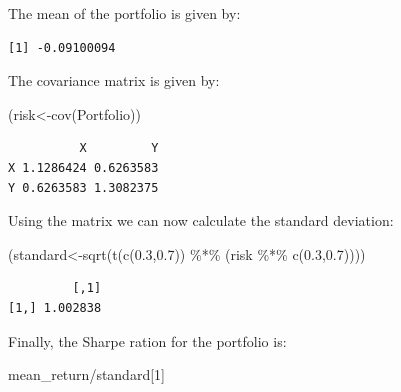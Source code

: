 \documentclass[
  letterpaper,
  DIV=11,
  numbers=noendperiod]{scrreprt}
\newenvironment{Shaded}{\begin{snugshade}}{\end{snugshade}}
\newcommand{\AttributeTok}[1]{\textcolor[rgb]{0.40,0.45,0.13}{#1}}
\newcommand{\DecValTok}[1]{\textcolor[rgb]{0.68,0.00,0.00}{#1}}
\newcommand{\FloatTok}[1]{\textcolor[rgb]{0.68,0.00,0.00}{#1}}
\newcommand{\FunctionTok}[1]{\textcolor[rgb]{0.28,0.35,0.67}{#1}}
\newcommand{\NormalTok}[1]{\textcolor[rgb]{0.00,0.23,0.31}{#1}}
\newcommand{\OtherTok}[1]{\textcolor[rgb]{0.00,0.23,0.31}{#1}}
\newcommand{\SpecialCharTok}[1]{\textcolor[rgb]{0.37,0.37,0.37}{#1}}
\begin{document}
The mean of the portfolio is given by:

\begin{Shaded}
\end{Shaded}

\begin{verbatim}
[1] -0.09100094
\end{verbatim}

The covariance matrix is given by:

\begin{Shaded}
\begin{Highlighting}[numbers=left,,]
\NormalTok{(risk}\OtherTok{\textless{}{-}}\FunctionTok{cov}\NormalTok{(Portfolio))}
\end{Highlighting}
\end{Shaded}

\begin{verbatim}
          X         Y
X 1.1286424 0.6263583
Y 0.6263583 1.3082375
\end{verbatim}

Using the matrix we can now calculate the standard deviation:

\begin{Shaded}
\begin{Highlighting}[numbers=left,,]
\NormalTok{(standard}\OtherTok{\textless{}{-}}\FunctionTok{sqrt}\NormalTok{(}\FunctionTok{t}\NormalTok{(}\FunctionTok{c}\NormalTok{(}\FloatTok{0.3}\NormalTok{,}\FloatTok{0.7}\NormalTok{)) }\SpecialCharTok{\%*\%}\NormalTok{ (risk }\SpecialCharTok{\%*\%} \FunctionTok{c}\NormalTok{(}\FloatTok{0.3}\NormalTok{,}\FloatTok{0.7}\NormalTok{))))}
\end{Highlighting}
\end{Shaded}

\begin{verbatim}
         [,1]
[1,] 1.002838
\end{verbatim}

Finally, the Sharpe ration for the portfolio is:

\begin{Shaded}
\begin{Highlighting}[numbers=left,,]
\NormalTok{mean\_return}\SpecialCharTok{/}\NormalTok{standard[}\DecValTok{1}\NormalTok{]}
\end{Highlighting}
\end{Shaded}
\end{document}
